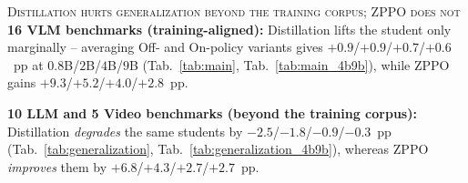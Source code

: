 


\begin{finding}{\textsc{Distillation hurts generalization beyond the training corpus; ZPPO does not}}
  \small
  \textcolor{OliveGreen}{\textbf{16 VLM benchmarks (training-aligned):}} Distillation lifts the student only marginally -- averaging Off- and On-policy variants gives $+0.9$/$+0.9$/$+0.7$/$+0.6$~pp at $0.8$B/$2$B/$4$B/$9$B (Tab.~\ref{tab:main}, Tab.~\ref{tab:main_4b9b}), while ZPPO gains $+9.3$/$+5.2$/$+4.0$/$+2.8$~pp.
  
  \textcolor{OliveGreen}{\textbf{10 LLM and 5 Video benchmarks (beyond the training corpus):}} Distillation \emph{degrades} the same students by $-2.5$/$-1.8$/$-0.9$/$-0.3$~pp (Tab.~\ref{tab:generalization}, Tab.~\ref{tab:generalization_4b9b}), whereas ZPPO \emph{improves} them by $+6.8$/$+4.3$/$+2.7$/$+2.7$~pp.
\end{finding}

